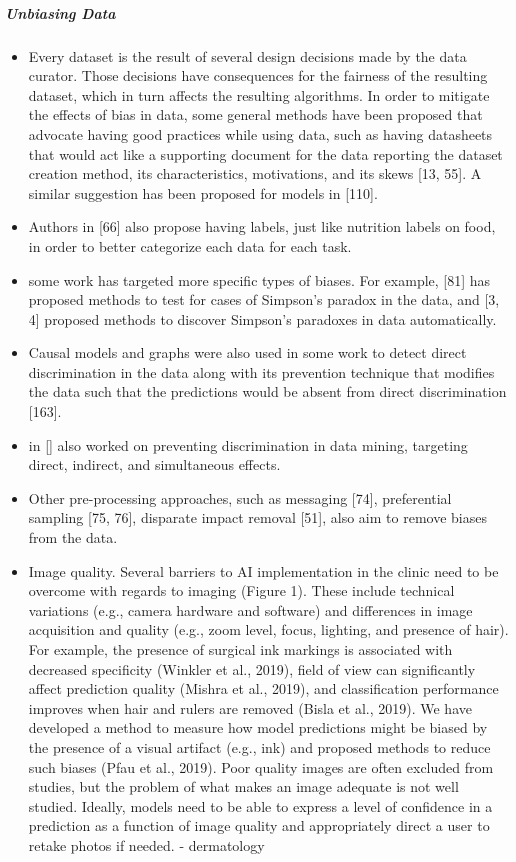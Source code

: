 \documentclass[12pt, a4paper, oneside]{book}   	%
\begin{document}
			\subparagraph{Unbiasing Data}
				\begin{itemize}
					\item Every dataset is the result of several design decisions made by the data curator. Those decisions have consequences for the fairness of the resulting dataset, which in turn affects the resulting algorithms. In order to mitigate the effects of bias in data, some general methods have been proposed that advocate having good practices while using data, such as having datasheets that would act like a supporting document for the data reporting the dataset creation method, its characteristics, motivations, and its skews [13, 55]. A similar suggestion has been proposed for models in [110].\autocite{Mehrabi_2021}
					\item Authors in [66] also propose having labels, just like nutrition labels on food, in order to better categorize each data for each task. \autocite{Mehrabi_2021}
					\item some work has targeted more specific types of biases. For example, [81] has proposed methods to test for cases of Simpson’s paradox in the data, and [3, 4] proposed methods to discover Simpson’s paradoxes in data automatically. \autocite{Mehrabi_2021}
					\item Causal models and graphs were also used in some work to detect direct discrimination in the data along with its prevention technique that modifies the data such that the predictions would be absent from direct discrimination [163].\autocite{Mehrabi_2021}
					\item in [\autocite{M62_Hajian_2013}] also worked on preventing discrimination in data mining, targeting direct, indirect, and simultaneous effects.\autocite{Mehrabi_2021}
					\item Other pre-processing approaches, such as messaging [74], preferential sampling [75, 76], disparate impact removal [51], also aim to remove biases from the data. \autocite{Mehrabi_2021}
					
					
					\item Image quality. Several barriers to AI implementation in the clinic need to be overcome with regards to imaging (Figure 1). These include technical variations (e.g., camera hardware and software) and differences in image acquisition and quality (e.g., zoom level, focus, lighting, and presence of hair). For example, the presence of surgical ink markings is associated with decreased specificity (Winkler et al., 2019), field of view can significantly affect prediction quality (Mishra et al., 2019), and classification performance improves when hair and rulers are removed (Bisla et al., 2019). We have developed a method to measure how model predictions might be biased by the presence of a visual artifact (e.g., ink) and proposed methods to reduce such biases (Pfau et al., 2019). Poor quality images are often excluded from studies, but the problem of what makes an image adequate is not well studied. Ideally, models need to be able to express a level of confidence in a prediction as a function of image quality and appropriately direct a user to retake photos if needed. \autocite{Young_2020} - dermatology
				\end{itemize}
			
\end{document}
